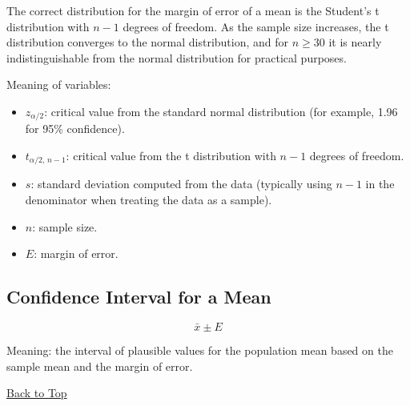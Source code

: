 The correct distribution for the margin of error of a mean is the Student's t distribution with \(n - 1\) degrees of freedom. As the sample size increases, the t distribution converges to the normal distribution, and for \(n \ge 30\) it is nearly indistinguishable from the normal distribution for practical purposes.

Meaning of variables:

\begin{itemize}
	\item \(z_{\alpha/2}\): critical value from the standard normal distribution (for example, 1.96 for 95\% confidence).
	\item \(t_{\alpha/2,\, n - 1}\): critical value from the t distribution with \(n - 1\) degrees of freedom.
	\item \(s\): standard deviation computed from the data (typically using \(n - 1\) in the denominator when treating the data as a sample).
	\item \(n\): sample size.
	\item \(E\): margin of error.
\end{itemize}

\subsection{Confidence Interval for a Mean}\label{sec:interval-mean-ci}

\[
\bar{x} \pm E
\]

Meaning: the interval of plausible values for the population mean based on the sample mean and the margin of error.

\vspace{6pt}
\noindent\hyperref[table-of-contents]{Back to Top}
